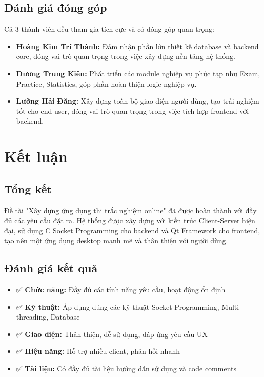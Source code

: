 ﻿\documentclass[12pt,a4paper]{report}
\begin{document}
\section{Đánh giá đóng góp}

Cả 3 thành viên đều tham gia tích cực và có đóng góp quan trọng:

\begin{itemize}
    \item \textbf{Hoàng Kim Trí Thành:} Đảm nhận phần lớn thiết kế database và backend core, đóng vai trò quan trọng trong việc xây dựng nền tảng hệ thống.
    \item \textbf{Dương Trung Kiên:} Phát triển các module nghiệp vụ phức tạp như Exam, Practice, Statistics, góp phần hoàn thiện logic nghiệp vụ.
    \item \textbf{Lường Hải Đăng:} Xây dựng toàn bộ giao diện người dùng, tạo trải nghiệm tốt cho end-user, đóng vai trò quan trọng trong việc tích hợp frontend với backend.
\end{itemize}

\chapter{Kết luận}

\section{Tổng kết}

Đề tài "Xây dựng ứng dụng thi trắc nghiệm online" đã được hoàn thành với đầy đủ các yêu cầu đặt ra. Hệ thống được xây dựng với kiến trúc Client-Server hiện đại, sử dụng C Socket Programming cho backend và Qt Framework cho frontend, tạo nên một ứng dụng desktop mạnh mẽ và thân thiện với người dùng.

\section{Đánh giá kết quả}

\begin{itemize}
    \item ✅ \textbf{Chức năng:} Đầy đủ các tính năng yêu cầu, hoạt động ổn định
    \item ✅ \textbf{Kỹ thuật:} Áp dụng đúng các kỹ thuật Socket Programming, Multi-threading, Database
    \item ✅ \textbf{Giao diện:} Thân thiện, dễ sử dụng, đáp ứng yêu cầu UX
    \item ✅ \textbf{Hiệu năng:} Hỗ trợ nhiều client, phản hồi nhanh
    \item ✅ \textbf{Tài liệu:} Có đầy đủ tài liệu hướng dẫn sử dụng và code comments
\end{itemize}
\end{document}

